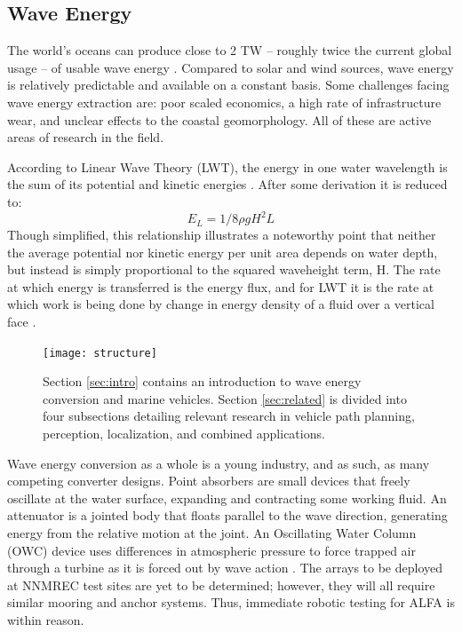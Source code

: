 \documentclass[conference]{IEEEtran}
\begin{document}
\subsection{Wave Energy}
The world's oceans can produce close to 2 TW -- roughly twice the current global usage -- of usable wave energy \cite{falnes}. Compared to solar and wind sources, wave energy is relatively predictable and available on a constant basis. Some challenges facing wave energy extraction are: poor scaled economics, a high rate of infrastructure wear, and unclear effects to the coastal geomorphology. All of these are active areas of research in the field.

According to Linear Wave Theory (LWT), the energy in one water wavelength is the sum of its potential and kinetic energies \cite{D&D}. After some derivation it is reduced to: 
\begin{equation}
E_L = 1/8 \rho g H^2 L
\end{equation}
Though simplified, this relationship illustrates a noteworthy point that neither the average potential nor kinetic energy per unit area depends on water depth, but instead is simply proportional to the squared waveheight term, H. The rate at which energy is transferred is the energy flux, and for LWT it is the rate at which work is being done by change in energy density of a fluid over a vertical face \cite{D&D}.

\begin{figure}
\texttt{[image: structure]}
\caption{Section \ref{sec:intro} contains an introduction to wave energy conversion and marine vehicles. Section \ref{sec:related} is divided into four subsections detailing relevant research in 
vehicle path planning, perception, localization, and combined applications.}
\centering
\label{fig:structure}
\end{figure}

Wave energy conversion as a whole is a young industry, and as such, as many competing converter designs. Point absorbers are small devices that freely oscillate at the water surface, expanding and contracting some working fluid. An attenuator is a jointed body that floats parallel to the wave direction, generating energy from the relative motion at the joint. An Oscillating Water Column (OWC) device uses differences in atmospheric pressure to force trapped air through a turbine as it is forced out by wave action \cite{falnes}. The arrays to be deployed at NNMREC test sites are yet to be determined; however, they will all require similar mooring and anchor systems. Thus, immediate robotic testing for ALFA is within reason.
\end{document}
